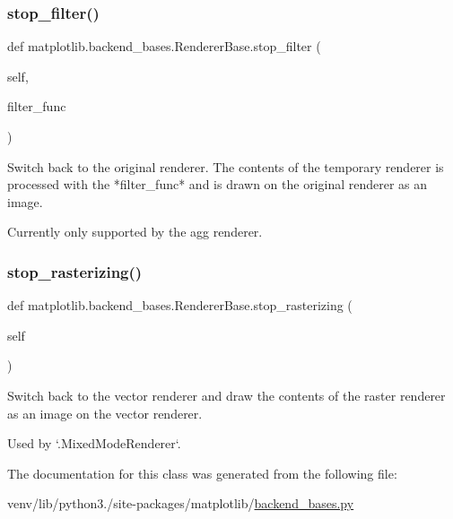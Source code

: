 \subsubsection{\texorpdfstring{stop\+\_\+filter()}{stop\_filter()}}
{\footnotesize\ttfamily def matplotlib.\+backend\+\_\+bases.\+Renderer\+Base.\+stop\+\_\+filter (\begin{DoxyParamCaption}\item[{}]{self,  }\item[{}]{filter\+\_\+func }\end{DoxyParamCaption})}

\begin{DoxyVerb}Switch back to the original renderer.  The contents of the temporary
renderer is processed with the *filter_func* and is drawn on the
original renderer as an image.

Currently only supported by the agg renderer.
\end{DoxyVerb}
 \mbox{\label{classmatplotlib_1_1backend__bases_1_1RendererBase_a596cc2026f43c4e9996e5f5d9b813e0a}} 
\subsubsection{\texorpdfstring{stop\+\_\+rasterizing()}{stop\_rasterizing()}}
{\footnotesize\ttfamily def matplotlib.\+backend\+\_\+bases.\+Renderer\+Base.\+stop\+\_\+rasterizing (\begin{DoxyParamCaption}\item[{}]{self }\end{DoxyParamCaption})}

\begin{DoxyVerb}Switch back to the vector renderer and draw the contents of the raster
renderer as an image on the vector renderer.

Used by `.MixedModeRenderer`.
\end{DoxyVerb}
 

The documentation for this class was generated from the following file\+:\begin{DoxyCompactItemize}
\item 
venv/lib/python3./site-\/packages/matplotlib/\hyperlink{backend__bases_8py}{backend\+\_\+bases.\+py}\end{DoxyCompactItemize}
